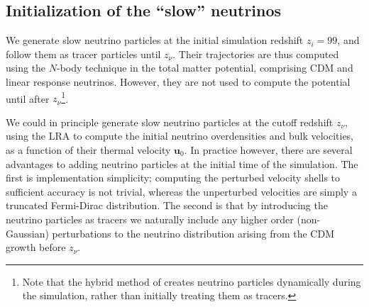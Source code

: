 \documentclass[useAMS, usenatbib]{mnras}
\newcommand{\barr}{\begin{eqnarray}}
\newcommand{\earr}{\end{eqnarray}}
\newcommand{\bs}{\boldsymbol}
\begin{document}


%



\subsection{Initialization of the ``slow'' neutrinos}

We generate slow neutrino particles at the initial simulation redshift $z_i = 99$, and follow them as tracer particles until $z_\nu$. Their trajectories are thus computed using the $N$-body technique in the total matter potential, comprising CDM and linear response neutrinos. However, they are not used to compute the potential until after $z_\nu$\footnote{Note that the hybrid method of \cite{Brandbyge_2010} creates neutrino particles dynamically during the simulation, rather than initially treating them as tracers.}.

We could in principle generate slow neutrino particles at the cutoff redshift $z_\nu$, using the LRA to compute the initial neutrino overdensities and bulk velocities, as a function of their thermal velocity $\bs{u}_0$. In practice however, there are several advantages to adding neutrino particles at the initial time of the simulation. The first is implementation simplicity; computing the perturbed velocity shells to sufficient accuracy is not trivial, whereas the unperturbed velocities are simply a truncated Fermi-Dirac distribution. The second is that by introducing the neutrino particles as tracers we naturally include any higher order (non-Gaussian) perturbations to the neutrino distribution arising from the CDM growth before $z_\nu$.
\end{document}
